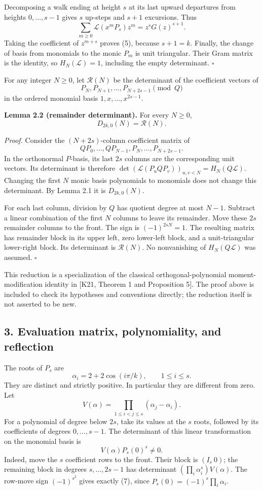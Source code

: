 \documentclass[
  11pt,
]{article}
\begin{document}
Decomposing a walk ending at height \(s\) at its last upward departures
from heights \(0,\ldots,s-1\) gives \(s\) up-steps and \(s+1\)
excursions. Thus \[
 \sum_{m\ge0}\mathcal L(x^mP_s)z^m=z^sG(z)^{s+1}.
\] Taking the coefficient of \(z^{m+s}\) proves (5), because \(s+1=k\).
Finally, the change of basis from monomials to the monic \(P_m\) is unit
triangular. Their Gram matrix is the identity, so \(H_N(\mathcal L)=1\),
including the empty determinant. \(\square\)

For any integer \(N\ge0\), let \(\mathcal R(N)\) be the determinant of
the coefficient vectors of \[
 P_N,P_{N+1},\ldots,P_{N+2s-1}\pmod Q
\] in the ordered monomial basis \(1,x,\ldots,x^{2s-1}\).

\textbf{Lemma 2.2 (remainder determinant).} For every \(N\ge0\), \[
 D_{2k,0}(N)=\mathcal R(N).
 \tag{6}
\]

\emph{Proof.} Consider the \((N+2s)\)-column coefficient matrix of \[
 QP_0,\ldots,QP_{N-1},P_N,\ldots,P_{N+2s-1}.
\] In the orthonormal \(P\)-basis, its last \(2s\) columns are the
corresponding unit vectors. Its determinant is therefore
\(\det(\mathcal L(P_uQP_v))_{u,v<N}=H_N(Q\mathcal L)\). Changing the
first \(N\) monic basis polynomials to monomials does not change this
determinant. By Lemma 2.1 it is \(D_{2k,0}(N)\).

For each last column, division by \(Q\) has quotient degree at most
\(N-1\). Subtract a linear combination of the first \(N\) columns to
leave its remainder. Move these \(2s\) remainder columns to the front.
The sign is \((-1)^{2sN}=1\). The resulting matrix has remainder block
in its upper left, zero lower-left block, and a unit-triangular
lower-right block. Its determinant is \(\mathcal R(N)\). No nonvanishing
of \(H_N(Q\mathcal L)\) was assumed. \(\square\)

This reduction is a specialization of the classical
orthogonal-polynomial moment-modification identity in {[}K21, Theorem 1
and Proposition 5{]}. The proof above is included to check its
hypotheses and conventions directly; the reduction itself is not
asserted to be new.

\subsection{3. Evaluation matrix, polynomiality, and
reflection}\label{evaluation-matrix-polynomiality-and-reflection}

The roots of \(P_s\) are \[
 \alpha_i=2+2\cos(i\pi/k),\qquad 1\le i\le s.
\] They are distinct and strictly positive. In particular they are
different from zero. Let \[
 V(\alpha)=\prod_{1\le i<j\le s}(\alpha_j-\alpha_i).
\] For a polynomial of degree below \(2s\), take its values at the \(s\)
roots, followed by its coefficients of degrees \(0,\ldots,s-1\). The
determinant of this linear transformation on the monomial basis is \[
 V(\alpha)P_s(0)^s\ne0.
 \tag{7}
\] Indeed, move the \(s\) coefficient rows to the front. Their block is
\((I_s\ 0)\); the remaining block in degrees \(s,\ldots,2s-1\) has
determinant \((\prod_i\alpha_i^s)V(\alpha)\). The row-move sign
\((-1)^{s^2}\) gives exactly (7), since
\(P_s(0)=(-1)^s\prod_i\alpha_i\).
\end{document}
